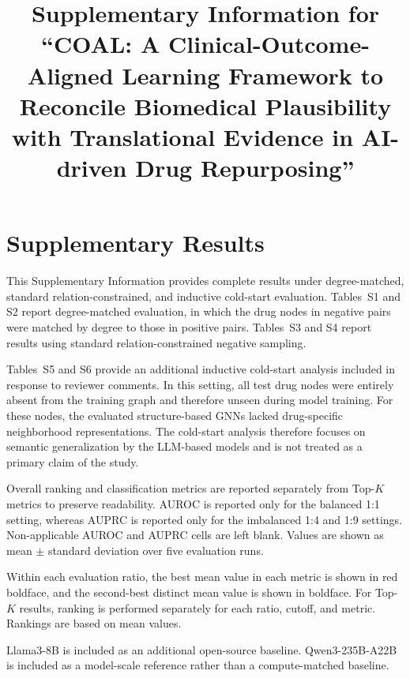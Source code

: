 \documentclass[pdflatex,sn-mathphys-num]{sn-jnl}
\begin{document}
\renewcommand{\thetable}{S\arabic{table}}

\title[Supplementary Information]
{Supplementary Information for ``COAL: A Clinical-Outcome-Aligned
Learning Framework to Reconcile Biomedical Plausibility with
Translational Evidence in AI-driven Drug Repurposing''}

\maketitle

\section*{Supplementary Results}

This Supplementary Information provides complete results under
degree-matched, standard relation-constrained, and inductive cold-start
evaluation. Tables~S1 and S2 report degree-matched evaluation, in which
the drug nodes in negative pairs were matched by degree to those in
positive pairs. Tables~S3 and S4 report results using standard
relation-constrained negative sampling.

Tables~S5 and S6 provide an additional inductive cold-start analysis
included in response to reviewer comments. In this setting, all test
drug nodes were entirely absent from the training graph and therefore
unseen during model training. For these nodes, the evaluated
structure-based GNNs lacked drug-specific neighborhood representations.
The cold-start analysis therefore focuses on semantic generalization
by the LLM-based models and is not treated as a primary claim of the
study.

Overall ranking and classification metrics are reported separately
from Top-\(K\) metrics to preserve readability. AUROC is reported only
for the balanced 1:1 setting, whereas AUPRC is reported only for the
imbalanced 1:4 and 1:9 settings. Non-applicable AUROC and AUPRC cells
are left blank. Values are shown as mean \(\pm\) standard deviation over
five evaluation runs.

Within each evaluation ratio, the best mean value in each metric is
shown in red boldface, and the second-best distinct mean value is shown
in boldface. For Top-\(K\) results, ranking is performed separately for
each ratio, cutoff, and metric. Rankings are based on mean values.

Llama3-8B is included as an additional open-source baseline.
Qwen3-235B-A22B is included as a model-scale reference rather than
a compute-matched baseline.
\end{document}
